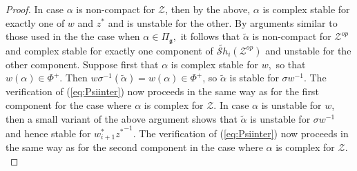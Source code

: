\documentclass[12pt]{amsart}
\numberwithin{equation}{section}
\newcommand{\cZ}{{\mathcal Z}}
\newcommand{\alphatilde}{{\tilde{\alpha}}}
\newcommand{\fg}{\mbox{${\mathfrak g}$}}
\newcommand{\Sh}{\mathcal{S}h}
\begin{document}
\begin{proof}
In case $\alpha$ is non-compact for $\cZ$, then by the above, $\alpha$ is complex stable for exactly one of $w$ and $z^*$ and is unstable for the other.   By arguments similar to those used in the the case when $\alpha \in \Pi_{\fg},$ it follows that $\alphatilde$ is non-compact for ${\cZ}^{op}$ and complex stable for exactly one component of $\widetilde{\Sh}_{i}({\cZ}^{op})$ and unstable for the other component.   Suppose first that $\alpha$ is complex stable for $w,$ so that $w(\alpha)\in \Phi^+.$    Then $w\sigma^{-1}(\alphatilde)=w(\alpha) \in \Phi^+$, so $\alphatilde$ is stable for $\sigma w^{-1}.$  The verification of (\ref{eq:Psiinter}) now proceeds in the same way as for the first component for the case where $\alpha$ is complex for $\cZ.$   In case $\alpha$ is unstable for $w$, then a small variant of the above argument shows that $\alphatilde$ is unstable for $\sigma w^{-1}$ and hence stable for $w_{i+1}^{*}{z^{*}}^{-1}.$  The verification of (\ref{eq:Psiinter}) now proceeds in the same way as for the second component in the case where $\alpha$ is complex for $\cZ.$




\end{proof}
\end{document}
